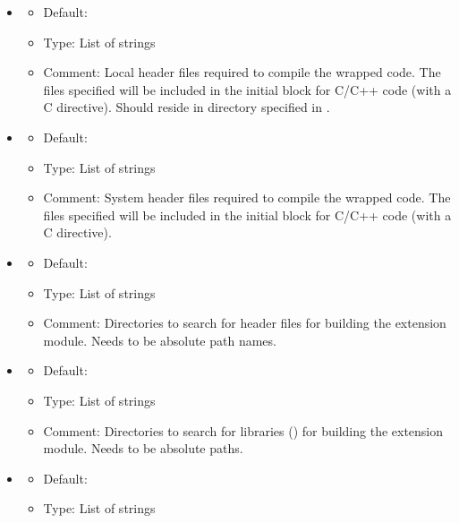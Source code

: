 \begin{itemize}
\begin{itemize}
      (with a C directive) and in the main section of the interface file (with
      a SWIG directive). Should reside in directory specified in
      .
  \end{itemize}
\item {}
  \begin{itemize}
    \item Default: \emp{[]}
    \item Type: List of strings
    \item Comment: Local header files required to compile the wrapped
      code. The files specified will be included in the initial block for C/C++ code
      (with a C directive). Should reside in directory specified in
      .
  \end{itemize}
\item {}
  \begin{itemize}
    \item Default: \emp{[]}
    \item Type: List of strings
    \item Comment: System header files required to compile the wrapped
      code. The files specified will be included in the initial block for C/C++
      code (with a C directive).
  \end{itemize}
\item {}
  \begin{itemize}
    \item Default: \emp{[]}
    \item Type: List of strings
    \item Comment: Directories to search for header files for building the
      extension module. Needs to be absolute path names.
  \end{itemize}
\item {}
  \begin{itemize}
    \item Default: \emp{[]}
    \item Type: List of strings
    \item Comment: Directories to search for libraries () for building
      the extension module. Needs to be absolute paths.
  \end{itemize}
\item {}
  \begin{itemize}
    \item Default: \emp{[]}
    \item Type: List of strings

\end{itemize}
\end{itemize}
